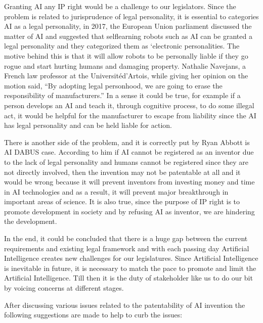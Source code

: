 \begin{multicols}{2}

\noi
Granting AI any IP right would be a challenge to our legislators. Since the problem is related
to jurisprudence of legal personality, it is essential to categories AI as a legal personality, in
2017, the European Union parliament discussed the matter of AI and suggested that selflearning robots such as AI can be granted a legal personality and they categorized them as
‘electronic personalities. The motive behind this is that it will allow robots to be personally
liable if they go rogue and start hurting humans and damaging property. Nathalie Navejans,
a French law professor at the Universitéd'Artois, while giving her opinion on the motion said, “By adopting legal personhood, we are going to erase the responsibility of
manufacturers.” In a sense it could be true, for example if a person develops an AI and teach
it, through cognitive process, to do some illegal act, it would be helpful for the manufacturer
to escape from liability since the AI has legal personality and can be held liable for action.

\noi
There is another side of the problem, and it is correctly put by Ryan Abbott is AI DABUS
case. According to him if AI cannot be registered as an inventor due to the lack of legal
personality and humans cannot be registered since they are not directly involved, then the
invention may not be patentable at all and it would be wrong because it will prevent
inventors from investing money and time in AI technologies and as a result, it will prevent
major breakthrough in important areas of science. It is also true, since the purpose of IP right
is to promote development in society and by refusing AI as inventor, we are hindering the
development.

\noi
In the end, it could be concluded that there is a huge gap between the current requirements
and existing legal framework and with each passing day Artificial Intelligence creates new
challenges for our legislatures. Since Artificial Intelligence is inevitable in future, it is
necessary to match the pace to promote and limit the Artificial Intelligence. Till then it is the
duty of stakeholder like us to do our bit by voicing concerns at different stages. 

\noi
After discussing various issues related to the patentability of AI invention the following
suggestions are made to help to curb the issues: 

\vspace{-.3cm}


\end{multicols}
